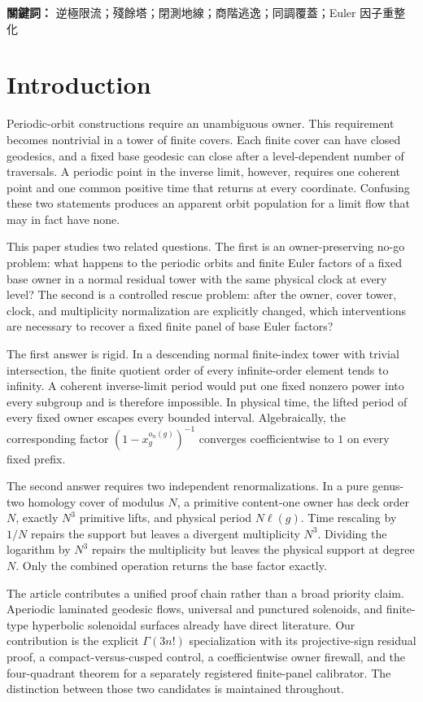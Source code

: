 \documentclass[11pt]{article}
\theoremstyle{definition}
\theoremstyle{remark}
\begin{document}
\medskip
\noindent\textbf{關鍵詞：} 逆極限流；殘餘塔；閉測地線；商階逃逸；同調覆蓋；Euler 因子重整化

\section{Introduction}

Periodic-orbit constructions require an unambiguous owner. This requirement becomes nontrivial in a tower of finite covers. Each finite cover can have closed geodesics, and a fixed base geodesic can close after a level-dependent number of traversals. A periodic point in the inverse limit, however, requires one coherent point and one common positive time that returns at every coordinate. Confusing these two statements produces an apparent orbit population for a limit flow that may in fact have none.

This paper studies two related questions. The first is an owner-preserving no-go problem: what happens to the periodic orbits and finite Euler factors of a fixed base owner in a normal residual tower with the same physical clock at every level? The second is a controlled rescue problem: after the owner, cover tower, clock, and multiplicity normalization are explicitly changed, which interventions are necessary to recover a fixed finite panel of base Euler factors?

The first answer is rigid. In a descending normal finite-index tower with trivial intersection, the finite quotient order of every infinite-order element tends to infinity. A coherent inverse-limit period would put one fixed nonzero power into every subgroup and is therefore impossible. In physical time, the lifted period of every fixed owner escapes every bounded interval. Algebraically, the corresponding factor $(1-x_g^{o_n(g)})^{-1}$ converges coefficientwise to $1$ on every fixed prefix.

The second answer requires two independent renormalizations. In a pure genus-two homology cover of modulus $N$, a primitive content-one owner has deck order $N$, exactly $N^3$ primitive lifts, and physical period $N\ell(g)$. Time rescaling by $1/N$ repairs the support but leaves a divergent multiplicity $N^3$. Dividing the logarithm by $N^3$ repairs the multiplicity but leaves the physical support at degree $N$. Only the combined operation returns the base factor exactly.

The article contributes a unified proof chain rather than a broad priority claim. Aperiodic laminated geodesic flows, universal and punctured solenoids, and finite-type hyperbolic solenoidal surfaces already have direct literature. Our contribution is the explicit $\Gamma(3n!)$ specialization with its projective-sign residual proof, a compact-versus-cusped control, a coefficientwise owner firewall, and the four-quadrant theorem for a separately registered finite-panel calibrator. The distinction between those two candidates is maintained throughout.
\end{document}
